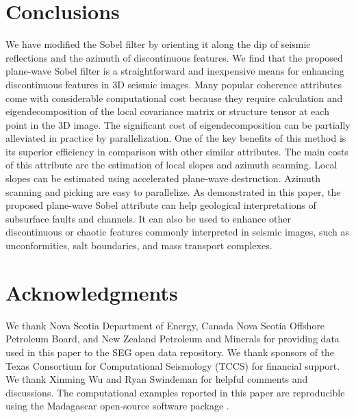 \section{Conclusions}
We have modified the Sobel filter by orienting it along the dip of seismic reflections and the azimuth of discontinuous features.
We find that the proposed plane-wave Sobel filter is a straightforward and inexpensive means for enhancing discontinuous features in 3{D} seismic images. 
Many popular coherence attributes come with considerable computational cost because they require calculation and eigendecomposition of the local covariance matrix or structure tensor at each point in the 3{D} image.
The significant cost of eigendecomposition can be partially alleviated in practice by parallelization.
One of the key benefits of this method is its superior efficiency in comparison with other similar attributes.
The main costs of this attribute are the estimation of local slopes and azimuth scanning.
Local slopes can be estimated using accelerated plane-wave destruction.
Azimuth scanning and picking are easy to parallelize.
As demonstrated in this paper, the proposed plane-wave Sobel attribute can help geological interpretations of subsurface faults and channels.
It can also be used to enhance other discontinuous or chaotic features commonly interpreted in seismic images, such as unconformities, salt boundaries, and mass transport complexes.

\section{Acknowledgments}
We thank Nova Scotia Department of Energy, Canada Nova Scotia Offshore Petroleum Board, and New Zealand Petroleum and Minerals for providing data used in this paper to the SEG open data repository.
We thank sponsors of the Texas Consortium for Computational Seismology (TCCS) for financial support.
We thank Xinming Wu and Ryan Swindeman for helpful comments and discussions.
The computational examples reported in this paper are reproducible using the Madagascar open-source software package \cite[]{fomel13}.

\onecolumn


